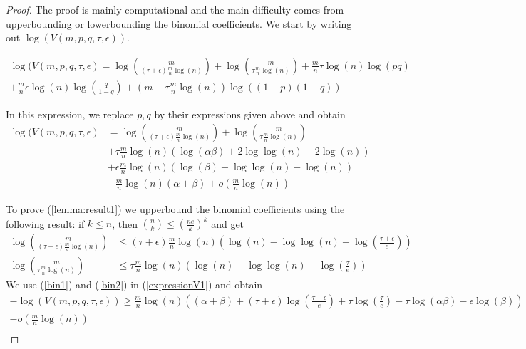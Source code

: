 \documentclass[english]{article}
\newcommand{\1}{\textbf{1}}
\begin{document}
\begin{proof}
The proof is mainly computational and the main difficulty comes from upperbounding or lowerbounding the binomial coefficients. We start by writing out $\log(V(m,p,q,\tau,\epsilon))$.

\begin{align*}
\log(V(m,p,q,\tau, \epsilon)=\log \binom{m}{(\tau+\epsilon)\frac{m}{n}\log(n)}+\log \binom{m}{\tau\frac{m}{n}\log(n)} +\frac{m}{n}\tau \log(n) \log(pq)\\
+\frac{m}{n} \epsilon \log(n) \log \left( \frac{q}{1-q}\right)+\left(m -\tau \frac{m}{n}\log(n) \right) \log\left((1-p)(1-q)\right)
\end{align*}

In this expression, we replace $p,q$ by their expressions given above and obtain
\begin{align} \label{expressionV1}
\log(V(m,p,q,\tau, \epsilon)&=\log \binom{m}{(\tau+\epsilon)\frac{m}{n}\log(n)}+\log \binom{m}{\tau\frac{m}{n}\log(n)} \nonumber\\
&+\tau \frac{m}{n} \log(n)   \left( \log(\alpha \beta)+2\log \log(n) -2\log(n) \right)\\
&+\epsilon \frac{m}{n} \log(n) \left( \log(\beta)+\log \log(n) -\log(n)  \right) \nonumber \\
& - \frac{m}{n} \log(n) (\alpha +\beta) + o \left( \frac{m}{n} \log(n) \right) \nonumber
\end{align}

To prove (\ref{lemma:result1}) we upperbound the binomial coefficients using the following result: if $k\leq n$, then $\binom{n}{k} \leq  \left( \frac{ne}{k} \right)^k$ and get
\begin{align}
\log \binom{m}{(\tau +\epsilon) \frac{m}{n}\log(n)} &\leq (\tau +\epsilon) \frac{m}{n} \log(n) \left( \log(n) -\log \log(n) -\log \left( \frac{\tau +\epsilon}{e}\right)\right) \label{bin1}\\
\log \binom{m}{\tau \frac{m}{n} \log(n)} &\leq \tau \frac{m}{n} \log(n) \left( \log(n) -\log \log(n) -\log \left( \frac{\tau}{e}\right)\right) \label{bin2}
\end{align}
We use (\ref{bin1}) and (\ref{bin2}) in (\ref{expressionV1}) and obtain
\begin{align} \label{expressionV2}
-\log(V(m,p,q,\tau, \epsilon)) \geq \frac{m}{n}\log(n) \left( (\alpha +\beta) +(\tau+\epsilon)\log \left( \frac{\tau +\epsilon}{e}\right) +\tau \log \left( \frac{\tau}{e}\right) -\tau \log(\alpha \beta) -\epsilon \log(\beta) \right)\\
 - o \left( \frac{m}{n} \log(n) \right) \nonumber\\ \nonumber
\end{align} 


\end{proof}
\end{document}
